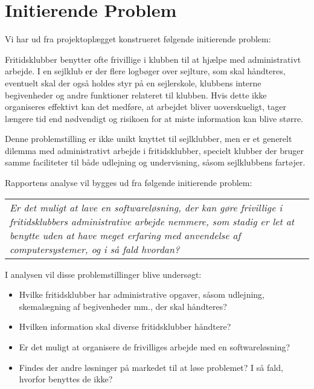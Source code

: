 \section{Initierende Problem}
Vi har ud fra projektoplægget konstrueret følgende initierende problem: 

Fritidsklubber benytter ofte frivillige i klubben til at hjælpe med administrativt arbejde. \citep{Frivilligrapporten}
I en sejlklub er der flere logbøger over sejlture, som skal håndteres, eventuelt skal der også holdes styr på en sejlerskole, klubbens interne begivenheder og andre funktioner relateret til klubben. 
Hvis dette ikke organiseres effektivt kan det medføre, at arbejdet bliver uoverskueligt, tager længere tid end nødvendigt og risikoen for at miste information kan blive større.

Denne problemstilling er ikke unikt knyttet til sejlklubber, men er et generelt dilemma med administrativt arbejde i fritidsklubber, specielt klubber der bruger samme faciliteter til både udlejning og undervisning, såsom sejlklubbens fartøjer.  

Rapportens analyse vil bygges ud fra følgende initierende problem:

\begin{center}
  \begin{tabular}{|p{14cm}|}
	\textit{Er det muligt at lave en softwareløsning, der kan gøre frivillige i fritidsklubbers administrative
	arbejde nemmere, som stadig er let at benytte uden at have meget erfaring med anvendelse af computersystemer, og i så fald hvordan?}
  \end{tabular}
\end{center}

I analysen vil disse problemstillinger blive undersøgt:

\begin{itemize}
  \item Hvilke fritidsklubber har administrative opgaver, såsom udlejning, skemalægning af begivenheder mm., der
        skal håndteres?
  \item Hvilken information skal diverse fritidsklubber håndtere?
  \item Er det muligt at organisere de frivilliges arbejde med en softwareløsning?
  \item Findes der andre løsninger på markedet til at løse problemet? I så fald, hvorfor benyttes de ikke?
\end{itemize}